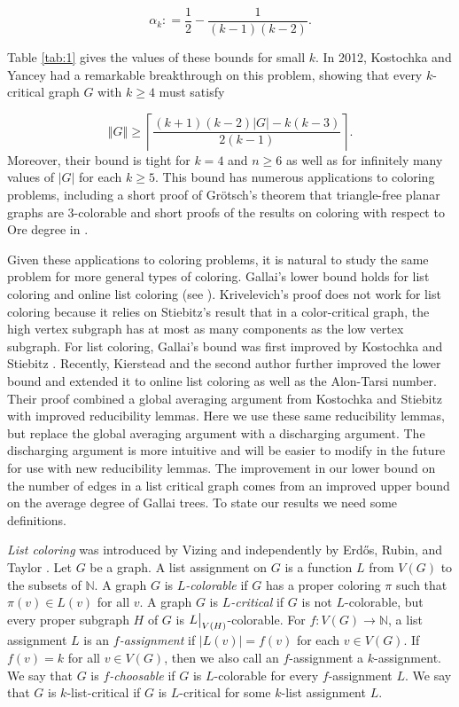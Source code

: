 \documentclass[12pt]{article}
\theoremstyle{plain}
\theoremstyle{definition}
\theoremstyle{remark}
\newcommand{\IN}{\mathbb{N}}
\newcommand{\card}[1]{\left|#1\right|}
\newcommand{\size}[1]{\left\Vert#1\right\Vert}
\newcommand{\ceil}[1]{\left\lceil#1\right\rceil}
\newcommand{\func}[3]{#1\colon #2 \rightarrow #3}
\newcommand{\DefinedAs}{\mathrel{\mathop:}=}
\newcommand\restr[2]{{%
  \left.\kern-\nulldelimiterspace %
  #1 %
  \vphantom{\big|} %
  \right|_{#2} %
  }}
\begin{document}
\[\alpha_k \DefinedAs \frac12 - \frac{1}{(k-1)(k-2)}.\]

Table \ref{tab:1} gives the values of these bounds for small $k$.  In 2012, Kostochka and Yancey \cite{kostochkayancey2012ore} had a remarkable breakthrough on this problem, showing that every $k$-critical graph $G$ with $k \ge 4$ must satisfy

\[\size{G} \ge \ceil{\frac{(k+1)(k-2)\card{G} - k(k-3)}{2(k-1)}}.\]
Moreover, their bound is tight for $k=4$ and $n \ge 6$ as well as for infinitely many values of $\card{G}$ for each $k \ge 5$.  This bound has numerous applications to coloring problems, including a short proof of Gr\"otsch's theorem that triangle-free planar graphs are $3$-colorable \cite{kostochka2012oregrotsch} and short proofs of the results on coloring with respect to Ore degree in \cite{kierstead2009ore, rabern2010a, krs_one}. 

Given these applications to coloring problems, it is natural to study the same problem for more general types of coloring.  Gallai's lower bound \cite{gallai1963kritische} holds for list coloring and online list coloring (see \cite{kostochkastiebitzedgesincriticalgraph, riasat2012critically}).  Krivelevich's proof \cite{krivelevich1997minimal} does not work for list coloring because it relies on Stiebitz's result \cite{stiebitz1982proof} that in a color-critical graph, the high vertex subgraph has at most as many components as the low vertex subgraph. For list coloring, Gallai's bound was first improved by Kostochka and Stiebitz \cite{kostochkastiebitzedgesincriticalgraph}.  Recently, Kierstead and the second author \cite{OreVizing} further improved the lower bound and extended it to online list coloring as well as the Alon-Tarsi number.  Their proof combined a global averaging argument from Kostochka and Stiebitz \cite{kostochkastiebitzedgesincriticalgraph} with improved reducibility lemmas.  Here we use these same reducibility lemmas, but replace the global averaging argument with a discharging argument.  The discharging argument is more intuitive and will be easier to modify in the future for use with new reducibility lemmas.  The improvement in our lower bound on the number of edges in a list critical graph comes from an improved upper bound on the average degree of Gallai trees.  To state our results we need some definitions.

\emph{List coloring} was introduced by Vizing \cite{vizing1976} and independently by Erd\H{o}s, Rubin, and Taylor \cite{erdos1979choosability}.  Let $G$ be a graph. A list assignment on $G$ is a function $L$ from $V(G)$ to the subsets of $\IN$.   A graph $G$ is \emph{$L$-colorable} if $G$ has a proper coloring $\pi$ such that $\pi(v)\in L(v)$ for all $v$.   A graph $G$ is \emph{$L$-critical} if $G$ is not $L$-colorable, but every proper subgraph $H$ of $G$ is $\restr{L}{V(H)}$-colorable. For $\func{f}{V(G)}{\IN}$, a list assignment $L$ is an \emph{$f$-assignment} if $\card{L(v)} = f(v)$ for each $v \in V(G)$.  If $f(v) = k$ for all $v \in V(G)$, then we also call an $f$-assignment a $k$-assignment.  We say that $G$ is \emph{$f$-choosable} if $G$ is $L$-colorable for every $f$-assignment $L$.  
We say that $G$ is $k$-list-critical if $G$ is $L$-critical for some $k$-list assignment $L$. %
\end{document}
